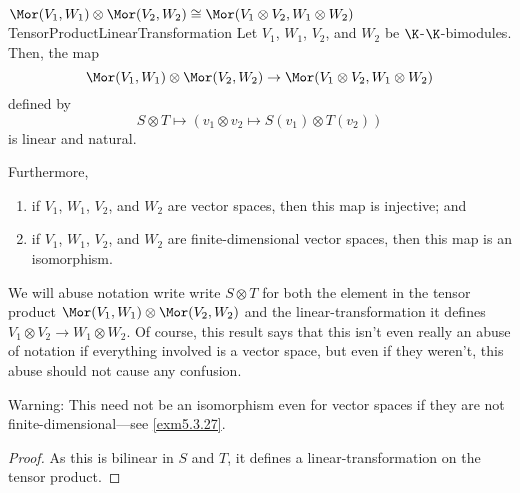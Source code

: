 \begin{thm}{$\Mor (V_1,W_1)\otimes \Mor (V_2,W_2)\cong \Mor (V_1\otimes V_2,W_1\otimes W_2)$}{TensorProductLinearTransformation}
	Let $V_1$, $W_1$, $V_2$, and $W_2$ be $\K$-$\K$-bimodules.  Then, the map
	\begin{equation*}
		\Mor (V_1,W_1)\otimes \Mor (V_2,W_2)\rightarrow \Mor (V_1\otimes V_2,W_1\otimes W_2)
	\end{equation*}
	defined by
	\begin{equation}
		S\otimes T\mapsto (v_1\otimes v_2\mapsto S(v_1)\otimes T(v_2))
	\end{equation}
	is linear and natural.
	
	Furthermore,
	\begin{enumerate}
		\item \label{TensorProductLinearTransformation(i)}if $V_1$, $W_1$, $V_2$, and $W_2$ are vector spaces, then this map is injective; and
		\item \label{TensorProductLinearTransformation(ii)}if $V_1$, $W_1$, $V_2$, and $W_2$ are finite-dimensional vector spaces, then this map is an isomorphism.
	\end{enumerate}
	\begin{rmk}
		We will abuse notation write write $S\otimes T$ for both the element in the tensor product $\Mor (V_1,W_1)\otimes \Mor (V_2,W_2)$ and the linear-transformation it defines $V_1\otimes V_2\rightarrow W_1\otimes W_2$.  Of course, this result says that this isn't even really an abuse of notation if everything involved is a vector space, but even if they weren't, this abuse should not cause any confusion.
	\end{rmk}
	\begin{rmk}
		Warning:  This need not be an isomorphism even for vector spaces if they are not finite-dimensional---see \cref{exm5.3.27}.
	\end{rmk}
	\begin{proof}
		As this is bilinear in $S$ and $T$, it defines a linear-transformation on the tensor product.
		

\end{proof}
\end{thm}
